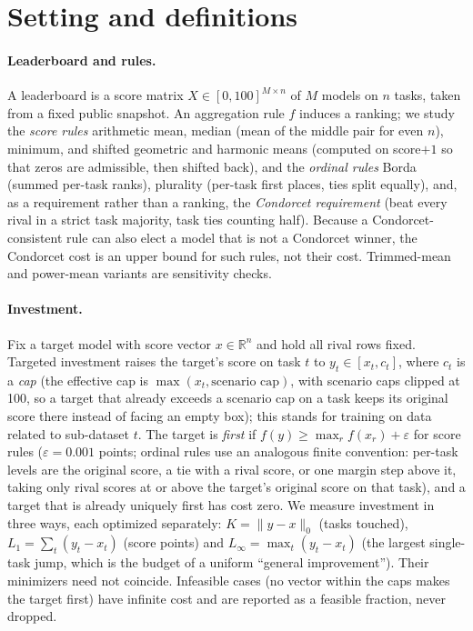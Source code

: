 \section{Setting and definitions}
\label{sec:setting}
\paragraph{Leaderboard and rules.}
A leaderboard is a score matrix $X\in[0,100]^{M\times n}$ of $M$ models on $n$ tasks, taken from a fixed public snapshot. An aggregation rule $f$ induces a ranking; we study the \emph{score rules} arithmetic mean, median (mean of the middle pair for even $n$), minimum, and shifted geometric and harmonic means (computed on score$+1$ so that zeros are admissible, then shifted back), and the \emph{ordinal rules} Borda (summed per-task ranks), plurality (per-task first places, ties split equally), and, as a requirement rather than a ranking, the \emph{Condorcet requirement} (beat every rival in a strict task majority, task ties counting half). Because a Condorcet-consistent rule can also elect a model that is not a Condorcet winner, the Condorcet cost is an upper bound for such rules, not their cost. Trimmed-mean and power-mean variants are sensitivity checks.

\paragraph{Investment.}
Fix a target model with score vector $x\in\mathbb{R}^n$ and hold all rival rows fixed. Targeted investment raises the target's score on task $t$ to $y_t\in[x_t,c_t]$, where $c_t$ is a \emph{cap} (the effective cap is $\max(x_t,\text{scenario cap})$, with scenario caps clipped at 100, so a target that already exceeds a scenario cap on a task keeps its original score there instead of facing an empty box); this stands for training on data related to sub-dataset $t$. The target is \emph{first} if $f(y)\ge \max_{r}f(x_r)+\varepsilon$ for score rules ($\varepsilon=0.001$ points; ordinal rules use an analogous finite convention: per-task levels are the original score, a tie with a rival score, or one margin step above it, taking only rival scores at or above the target's original score on that task), and a target that is already uniquely first has cost zero. We measure investment in three ways, each optimized separately: $K=\|y-x\|_0$ (tasks touched), $L_1=\sum_t(y_t-x_t)$ (score points) and $L_\infty=\max_t(y_t-x_t)$ (the largest single-task jump, which is the budget of a uniform ``general improvement''). Their minimizers need not coincide. Infeasible cases (no vector within the caps makes the target first) have infinite cost and are reported as a feasible fraction, never dropped.

